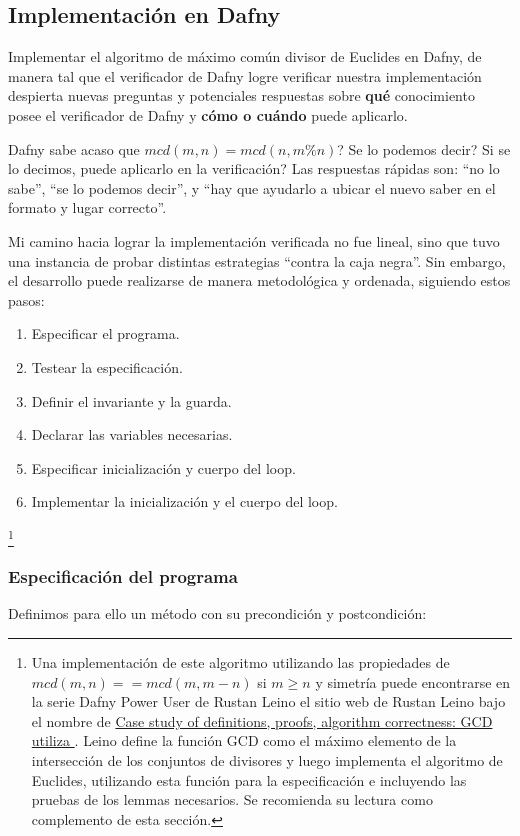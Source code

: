 \documentclass[12pt, a4paper, openany, fleqn]{book}
\begin{document}
    \subsection{Implementación en Dafny}
    Implementar el algoritmo de máximo común divisor de Euclides en Dafny, de manera tal que el verificador de Dafny logre verificar nuestra implementación despierta nuevas preguntas y potenciales respuestas sobre \textbf{qué} conocimiento posee el verificador de Dafny y \textbf{cómo o cuándo} puede aplicarlo.

    Dafny sabe acaso que $mcd(m, n) = mcd(n, m\%n)$? Se lo podemos decir? Si se lo decimos, puede aplicarlo en la verificación?
    Las respuestas rápidas son: ``no lo sabe'', ``se lo podemos decir'', y ``hay que ayudarlo a ubicar el nuevo saber en el formato y lugar correcto''.

    Mi camino hacia lograr la implementación verificada no fue lineal, sino que tuvo una instancia de probar distintas estrategias ``contra la caja negra''. Sin embargo, el desarrollo puede realizarse de manera metodológica y ordenada, siguiendo estos pasos:
    \begin{enumerate}
        \item Especificar el programa.
        \item Testear la especificación.
        \item Definir el invariante y la guarda.
        \item Declarar las variables necesarias.
        \item Especificar inicialización y cuerpo del loop.
        \item Implementar la inicialización y el cuerpo del loop.
    \end{enumerate}

    \footnote{
    Una implementación de este algoritmo utilizando las propiedades de $mcd(m, n) == mcd(m, m - n)$ si $m \ge n$ y simetría puede encontrarse en la serie Dafny Power User de Rustan Leino el sitio web de Rustan Leino bajo el nombre de \href{https://leino.science/papers/krml279.html}{Case study of definitions, proofs, algorithm correctness: GCD utiliza
    }. Leino define la función GCD como el máximo elemento de la intersección de los conjuntos de divisores y luego implementa el algoritmo de Euclides, utilizando esta función para la especificación e incluyendo las pruebas de los lemmas necesarios. Se recomienda su lectura como complemento de esta sección.}

    \subsubsection*{Especificación del programa}
    Definimos para ello un método con su precondición y postcondición:
\end{document}
